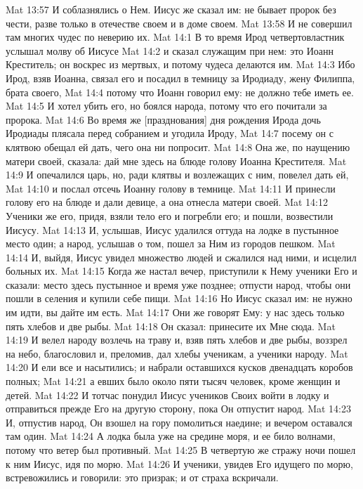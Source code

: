 Mat 13:57  И соблазнялись о Нем. Иисус же сказал им: не бывает пророк без чести, разве только в отечестве своем и в доме своем.
Mat 13:58  И не совершил там многих чудес по неверию их.
Mat 14:1  В то время Ирод четвертовластник услышал молву об Иисусе
Mat 14:2  и сказал служащим при нем: это Иоанн Креститель; он воскрес из мертвых, и потому чудеса делаются им.
Mat 14:3  Ибо Ирод, взяв Иоанна, связал его и посадил в темницу за Иродиаду, жену Филиппа, брата своего,
Mat 14:4  потому что Иоанн говорил ему: не должно тебе иметь ее.
Mat 14:5  И хотел убить его, но боялся народа, потому что его почитали за пророка.
Mat 14:6  Во время же [празднования] дня рождения Ирода дочь Иродиады плясала перед собранием и угодила Ироду,
Mat 14:7  посему он с клятвою обещал ей дать, чего она ни попросит.
Mat 14:8  Она же, по наущению матери своей, сказала: дай мне здесь на блюде голову Иоанна Крестителя.
Mat 14:9  И опечалился царь, но, ради клятвы и возлежащих с ним, повелел дать ей,
Mat 14:10  и послал отсечь Иоанну голову в темнице.
Mat 14:11  И принесли голову его на блюде и дали девице, а она отнесла матери своей.
Mat 14:12  Ученики же его, придя, взяли тело его и погребли его; и пошли, возвестили Иисусу.
Mat 14:13  И, услышав, Иисус удалился оттуда на лодке в пустынное место один; а народ, услышав о том, пошел за Ним из городов пешком.
Mat 14:14  И, выйдя, Иисус увидел множество людей и сжалился над ними, и исцелил больных их.
Mat 14:15  Когда же настал вечер, приступили к Нему ученики Его и сказали: место здесь пустынное и время уже позднее; отпусти народ, чтобы они пошли в селения и купили себе пищи.
Mat 14:16  Но Иисус сказал им: не нужно им идти, вы дайте им есть.
Mat 14:17  Они же говорят Ему: у нас здесь только пять хлебов и две рыбы.
Mat 14:18  Он сказал: принесите их Мне сюда.
Mat 14:19  И велел народу возлечь на траву и, взяв пять хлебов и две рыбы, воззрел на небо, благословил и, преломив, дал хлебы ученикам, а ученики народу.
Mat 14:20  И ели все и насытились; и набрали оставшихся кусков двенадцать коробов полных;
Mat 14:21  а евших было около пяти тысяч человек, кроме женщин и детей.
Mat 14:22  И тотчас понудил Иисус учеников Своих войти в лодку и отправиться прежде Его на другую сторону, пока Он отпустит народ.
Mat 14:23  И, отпустив народ, Он взошел на гору помолиться наедине; и вечером оставался там один.
Mat 14:24  А лодка была уже на средине моря, и ее било волнами, потому что ветер был противный.
Mat 14:25  В четвертую же стражу ночи пошел к ним Иисус, идя по морю.
Mat 14:26  И ученики, увидев Его идущего по морю, встревожились и говорили: это призрак; и от страха вскричали.
